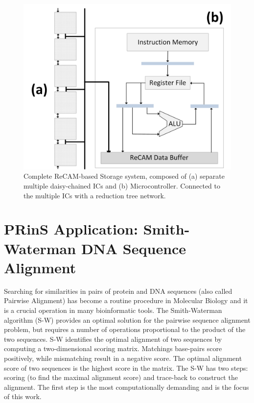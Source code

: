 \documentclass{superfri}
\begin{document}
\begin{figure}[h!]
	\centerline{\includegraphics[scale=0.6]{Figures/ReCAM_Single_IC_Column.jpg}}
	\caption{Complete ReCAM-based Storage system, composed of (a) separate multiple daisy-chained ICs and (b) Microcontroller. Connected to the multiple ICs with a reduction tree network.}
	\label{fig:ReCAM_system}
\end{figure}

\section{PRinS Application: Smith-Waterman DNA Sequence Alignment}
\label{sec:smith_waterman}

Searching for similarities in pairs of protein and DNA sequences (also called Pairwise Alignment) has become a routine procedure in Molecular Biology and it is a crucial operation in many bioinformatic tools. The Smith-Waterman algorithm (S-W) \cite{smith1981identification} provides an optimal solution for the pairwise sequence alignment problem, but requires a number of operations proportional to the product of the two sequences. 
S-W identifies the optimal alignment of two sequences by computing a two-dimensional scoring matrix. Matchings base-pairs score positively, while mismatching result in a negative score. The optimal alignment score of two sequences is the highest score in the matrix. The S-W has two steps: scoring (to find the maximal alignment score) and trace-back to construct the alignment. The first step is the most computationally demanding and is the focus of this work.
\end{document}
